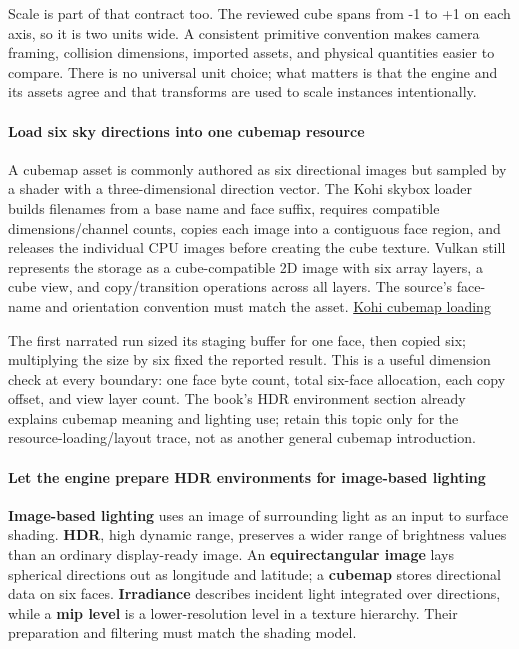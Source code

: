 Scale is part of that contract too. The reviewed cube spans from -1 to +1 on each axis, so it is two units wide. A consistent primitive convention makes camera framing, collision dimensions, imported assets, and physical quantities easier to compare. There is no universal unit choice; what matters is that the engine and its assets agree and that transforms are used to scale instances intentionally.

\paragraph{Load six sky directions into one cubemap resource}\label{load-six-sky-directions-into-one-cubemap-resource}

A cubemap asset is commonly authored as six directional images but sampled by a shader with a three-dimensional direction vector. The Kohi skybox loader builds filenames from a base name and face suffix, requires compatible dimensions/channel counts, copies each image into a contiguous face region, and releases the individual CPU images before creating the cube texture. Vulkan still represents the storage as a cube-compatible 2D image with six array layers, a cube view, and copy/transition operations across all layers. The source's face-name and orientation convention must match the asset. \href{https://www.youtube.com/watch?v=-6yPOAwbjSI}{Kohi cubemap loading}

The first narrated run sized its staging buffer for one face, then copied six; multiplying the size by six fixed the reported result. This is a useful dimension check at every boundary: one face byte count, total six-face allocation, each copy offset, and view layer count. The book's HDR environment section already explains cubemap meaning and lighting use; retain this topic only for the resource-loading/layout trace, not as another general cubemap introduction.

\paragraph{Let the engine prepare HDR environments for image-based lighting}\label{let-the-engine-prepare-hdr-environments-for-image-based-lighting}

\textbf{Image-based lighting} uses an image of surrounding light as an input to surface shading. \textbf{HDR}, high dynamic range, preserves a wider range of brightness values than an ordinary display-ready image. An \textbf{equirectangular image} lays spherical directions out as longitude and latitude; a \textbf{cubemap} stores directional data on six faces. \textbf{Irradiance} describes incident light integrated over directions, while a \textbf{mip level} is a lower-resolution level in a texture hierarchy. Their preparation and filtering must match the shading model.

